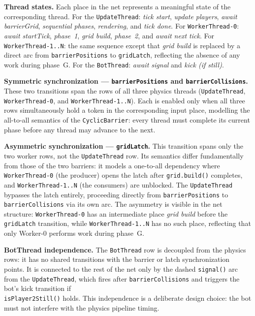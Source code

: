 \documentclass[12pt,a4paper]{article}
\begin{document}
\textbf{Thread states.} Each place in the net represents a meaningful state
of the corresponding thread. For the \texttt{UpdateThread}: \textit{tick start},
\textit{update players}, \textit{await barrierGrid}, \textit{sequential phases},
\textit{rendering}, and \textit{tick done}. For \texttt{WorkerThread-0}:
\textit{await startTick}, \textit{phase~1}, \textit{grid build}, \textit{phase~2},
and \textit{await next tick}. For \texttt{WorkerThread-1..N}: the same sequence
except that \textit{grid build} is replaced by a direct arc from
\texttt{barrierPositions} to \texttt{gridLatch}, reflecting the absence of any
work during phase~G. For the \texttt{BotThread}: \textit{await signal} and
\textit{kick (if still)}.

\textbf{Symmetric synchronization — \texttt{barrierPositions} and
\texttt{barrierCollisions}.} These two transitions span the rows of all three
physics threads (\texttt{UpdateThread},\\
\texttt{WorkerThread-0}, and
\texttt{WorkerThread-1..N}). Each is enabled only when all three rows
simultaneously hold a token in the corresponding input place, modelling the
all-to-all semantics of the \texttt{CyclicBarrier}: every thread must complete
its current phase before any thread may advance to the next.

\textbf{Asymmetric synchronization — \texttt{gridLatch}.} This transition spans
only the two worker rows, not the \texttt{UpdateThread} row. Its semantics differ
fundamentally from those of the two barriers: it models a one-to-all dependency
where \texttt{WorkerThread-0} (the producer) opens the latch after
\texttt{grid.build()} completes, and \texttt{WorkerThread-1..N} (the consumers)
are unblocked. The \texttt{UpdateThread} bypasses the latch entirely, proceeding
directly from \texttt{barrierPositions} to \texttt{barrierCollisions} via its own
arc. The asymmetry is visible in the net structure: \texttt{WorkerThread-0} has an
intermediate place \textit{grid build} before the \texttt{gridLatch} transition,
while \texttt{WorkerThread-1..N} has no such place, reflecting that only Worker-0
performs work during phase~G.

\textbf{BotThread independence.} The \texttt{BotThread} row is decoupled from
the physics rows: it has no shared transitions with the barrier or latch
synchronization points. It is connected to the rest of the net only by the
dashed \texttt{signal()} arc from the \texttt{UpdateThread}, which fires after
\texttt{barrierCollisions} and triggers the bot's kick transition if\\
\texttt{isPlayer2Still()} holds. This independence is a deliberate design choice:
the bot must not interfere with the physics pipeline timing.
\end{document}
